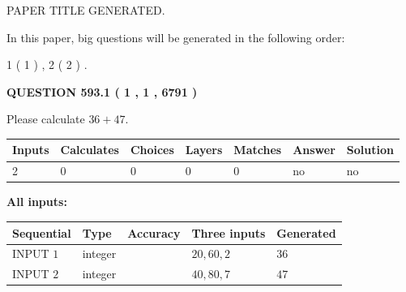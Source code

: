 \documentclass[12pt]{article}
\begin{document}
   
\vspace{0.2in}
   
   
   
   
   
   
   
   
 \vspace{0.2in}
 
 
 
 
   
   
 PAPER TITLE GENERATED.
   
   
   
\vspace{0.2in}
   
In this paper, big questions will be generated in the following order: 
   
   
   1 ( 1 )
 ,
   2 ( 2 )
 .
  
\vspace{0.2in}
  
{\textbf{\Large{QUESTION
593.1 
 ( 1 , 1 , 6791 )
}}}
  
  
 
Please calculate $ %
36 +  %
47 $.
 
 
   
   
   
   
\noindent\begin{tabular}{|l|l|l|l|l|l|l|}
 \hline
Inputs & Calculates & Choices & Layers & Matches & Answer & Solution \\ \hline
 2  & 
 0  & 
 0
  & 
 0  & 
 0  & 
  no & 
  no 
  \\ \hline
 \end{tabular}
   
   
   
   
\noindent{}
   
   
   
   
\noindent\vspace{0.1in}\hspace{-0.08in} {\textbf{\Large{All inputs: }}}
   
   
  
  
\noindent\begin{tabular}{|l|l|l|l|l|}
\hline
 Sequential & Type & Accuracy & Three inputs & Generated \\ 
\hline
 
 
  INPUT $  1 $ & integer &  & $
 20
 , 
 60
 , 
 2
 $ & $ 36 $ 
 \\  \hline  
 
 
  INPUT $  2 $ & integer &  & $
 40
 , 
 80
 , 
 7
 $ & $ 47 $ 
 \\  \hline  
 \end{tabular}
   
\end{document}
